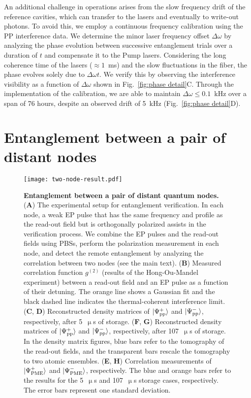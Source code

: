 \documentclass[aps,reprint,showpacs,superscriptaddress]{revtex4-2}
\begin{document}
An additional challenge in operations arises from the slow frequency drift of the reference cavities, which can transfer to the lasers and eventually to write-out photons. To avoid this, we employ a continuous frequency calibration using the PP interference data. We determine the minor laser frequency offset $\Delta \omega$ by analyzing the phase evolution between successive entanglement trials over a duration of $t$ and compensate it to the Pump lasers. Considering the long coherence time of the lasers ($\approx 1$~ms) and the slow fluctuations in the fiber, the phase evolves solely due to $\Delta\omega t$. We verify this by observing the interference visibility as a function of $\Delta \omega$ shown in Fig.~\ref{fig:phase detail}C. Through the implementation of the calibration, we are able to maintain $\Delta\omega\leq 0.1$~kHz over a span of 76 hours, despite an observed drift of 5~kHz (Fig.~\ref{fig:phase detail}D).

\section*{Entanglement between a pair of distant nodes}
\begin{figure*}
	\centering
	\texttt{[image: two-node-result.pdf]}
	 \caption{\textbf{Entanglement between a pair of distant quantum nodes.} 
	 (\textbf{A}) The experimental setup for entanglement verification. In each node, a weak EP pulse that has the same frequency and profile as the read-out field but is orthogonally polarized assists in the verification process. We combine the EP pulses and the read-out fields using PBSs, perform the polarization measurement in each node, and detect the remote entanglement by analyzing the correlation between two nodes (see the main text).
	 (\textbf{B}) Measured correlation function $g^{(2)}$ (results of the Hong-Ou-Mandel experiment) between a read-out field and an EP pulse as a function of their detuning. The orange line shows a Gaussian fit and the black dashed line indicates the thermal-coherent interference limit.
	 (\textbf{C}, \textbf{D}) Reconstructed density matrices of $\ket{\Psi_{\textrm{pp}}^+}$ and $\ket{\Psi_{\textrm{pp}}^-}$, respectively, after 5~$\upmu$s of storage. 
	 (\textbf{F}, \textbf{G}) Reconstructed density matrices of $\ket{\Psi_{\textrm{pp}}^+}$ and $\ket{\Psi_{\textrm{pp}}^-}$, respectively, after 107~$\upmu$s of storage. In the density matrix figures, blue bars refer to the tomography of the read-out fields, and the transparent bars rescale the tomography to two atomic ensembles.  
	 (\textbf{E}, \textbf{H}) Correlation measurements of $\ket{\Psi_{\textrm{PME}}^+}$ and $\ket{\Psi_{\textrm{PME}}^-}$, respectively. The blue and orange bars refer to the results for the 5~$\upmu$s and 107~$\upmu$s storage cases, respectively. The error bars represent one standard deviation.}
	\label{fig:two node result}
\end{figure*}
\end{document}
